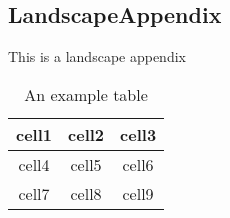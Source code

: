 \begin{landscape}
\chapter{LandscapeAppendix}
\label{app:landscape_appendix}
\begin{center}
This is a landscape appendix\\
\begin{table}[h]
    \centering
        \begin{tabular}{ |c|c|c| } 
            \hline
            cell1 & cell2 & cell3 \\ 
            \hline
            cell4 & cell5 & cell6 \\ 
            \hline
            cell7 & cell8 & cell9 \\ 
            \hline
    \end{tabular}
    \caption{An example table}
    \label{tab:exampletable1}
\end{table}
\end{center}
\end{landscape}
